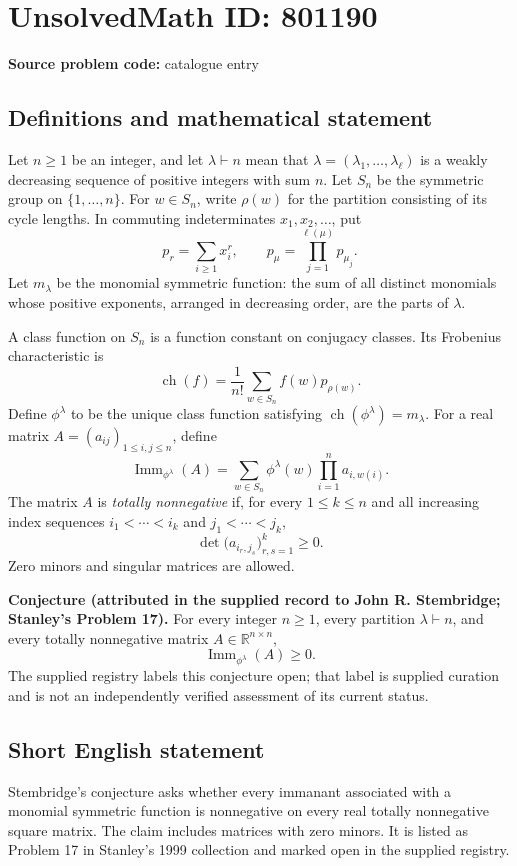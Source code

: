 \documentclass[11pt]{article}
\newcommand{\R}{\mathbb{R}}
\begin{document}
\section*{UnsolvedMath ID: 801190}
\textbf{Source problem code:} catalogue entry
\subsection{Definitions and mathematical statement}
Let \(n\geq 1\) be an integer, and let \(\lambda\vdash n\) mean that \(\lambda=(\lambda_1,\ldots,\lambda_\ell)\) is a weakly decreasing sequence of positive integers with sum \(n\). Let \(S_n\) be the symmetric group on \(\{1,\ldots,n\}\). For \(w\in S_n\), write \(\rho(w)\) for the partition consisting of its cycle lengths. In commuting indeterminates \(x_1,x_2,\ldots\), put
\[
p_r=\sum_{i\geq 1}x_i^r,\qquad p_\mu=\prod_{j=1}^{\ell(\mu)}p_{\mu_j}.
\]
Let \(m_\lambda\) be the monomial symmetric function: the sum of all distinct monomials whose positive exponents, arranged in decreasing order, are the parts of \(\lambda\).

A class function on \(S_n\) is a function constant on conjugacy classes. Its Frobenius characteristic is
\[
\operatorname{ch}(f)=\frac{1}{n!}\sum_{w\in S_n}f(w)p_{\rho(w)}.
\]
Define \(\phi^\lambda\) to be the unique class function satisfying \(\operatorname{ch}(\phi^\lambda)=m_\lambda\). For a real matrix \(A=(a_{ij})_{1\leq i,j\leq n}\), define
\[
\operatorname{Imm}_{\phi^\lambda}(A)
=\sum_{w\in S_n}\phi^\lambda(w)\prod_{i=1}^{n}a_{i,w(i)}.
\]
The matrix \(A\) is \emph{totally nonnegative} if, for every \(1\leq k\leq n\) and all increasing index sequences \(i_1<\cdots<i_k\) and \(j_1<\cdots<j_k\),
\[
\det\bigl(a_{i_r,j_s}\bigr)_{r,s=1}^{k}\geq 0.
\]
Zero minors and singular matrices are allowed.

\textbf{Conjecture (attributed in the supplied record to John R. Stembridge; Stanley's Problem 17).} For every integer \(n\geq1\), every partition \(\lambda\vdash n\), and every totally nonnegative matrix \(A\in\R^{n\times n}\),
\[
\operatorname{Imm}_{\phi^\lambda}(A)\geq0.
\]
The supplied registry labels this conjecture open; that label is supplied curation and is not an independently verified assessment of its current status.
\subsection{Short English statement}
Stembridge's conjecture asks whether every immanant associated with a monomial symmetric function is nonnegative on every real totally nonnegative square matrix. The claim includes matrices with zero minors. It is listed as Problem 17 in Stanley's 1999 collection and marked open in the supplied registry.
\end{document}

